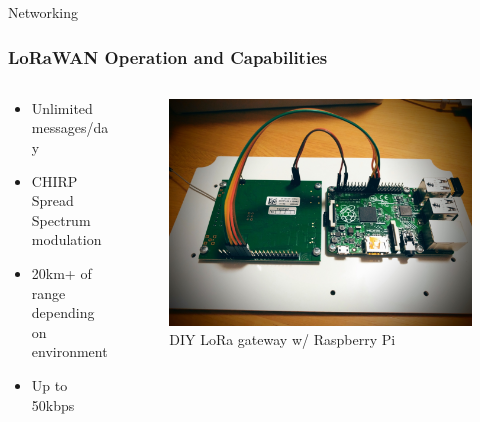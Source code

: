\documentclass{beamer}
\begin{document}
  \begin{frame}{Networking}
    \frametitle{LoRaWAN Operation and Capabilities}
    \begin{columns}
      \begin{column}{0.5\textwidth}
        \begin{itemize}
          \item Unlimited messages/day
          \item CHIRP Spread Spectrum modulation
          \item 20km+ of range depending on environment
          \item Up to 50kbps
        \end{itemize}
      \end{column}
      \begin{column}{0.5\textwidth}
        \begin{figure}[htbp]
          \centering
          \includegraphics[width=\textwidth]{DIYloraGateway.jpg}
          \caption{DIY LoRa gateway w/ Raspberry Pi \cite{DIYLoRa}}
          \label{fig:DIY_LoRa_Gateway}
        \end{figure}
      \end{column}
    \end{columns}
  \end{frame}
\end{document}
